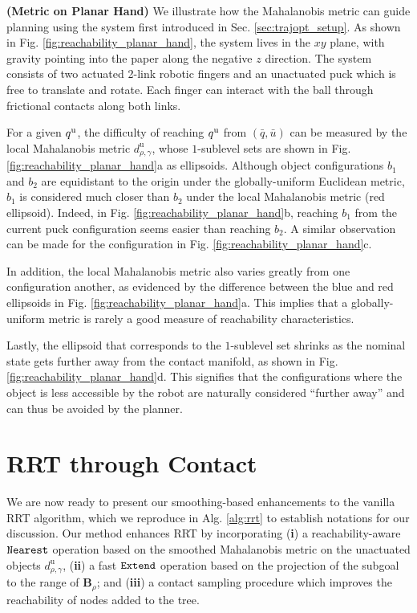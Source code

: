 \begin{example} \normalfont \textbf{(Metric on Planar Hand)}
\label{ex:planarhandreachableset}
We illustrate how the Mahalanobis metric can guide planning using the  system first introduced in Sec. \ref{sec:trajopt_setup}.
As shown in Fig. \ref{fig:reachability_planar_hand}, the system lives in the $xy$ plane, with gravity pointing into the paper along the negative $z$ direction. The system consists of two actuated 2-link robotic fingers and an unactuated puck which is free to translate and rotate. Each finger can interact with the ball through frictional contacts along both links.

For a given ${q^\mathrm{u}}$, the difficulty of reaching ${q^\mathrm{u}}$ from $(\bar{q}, \bar{u})$ can be measured by the local Mahalanobis metric $d^\mathrm{u}_{\rho, \gamma}$, whose $1$-sublevel sets are shown in Fig. \ref{fig:reachability_planar_hand}a as ellipsoids. Although object configurations $b_1$ and $b_2$ are equidistant to the origin under the globally-uniform Euclidean metric, $b_1$ is considered much closer than $b_2$ under the local Mahalanobis metric (red ellipsoid). Indeed, in Fig. \ref{fig:reachability_planar_hand}b, reaching $b_1$ from the current puck configuration seems easier than reaching $b_2$. A similar observation can be made for the configuration in Fig. \ref{fig:reachability_planar_hand}c.

In addition, the local Mahalanobis metric also varies greatly from one configuration another, as evidenced by the difference between the blue and red ellipsoids in Fig. \ref{fig:reachability_planar_hand}a. This implies that a globally-uniform metric is rarely a good measure of reachability characteristics.

Lastly, the ellipsoid that corresponds to the $1$-sublevel set shrinks as the nominal state gets further away from the contact manifold, as shown in Fig. \ref{fig:reachability_planar_hand}d. This signifies that the configurations where the object is less accessible by the robot are naturally considered ``further away'' and can thus be avoided by the planner.
\end{example}


\section{RRT through Contact \label{sec:rrt_for_contact}}
\noindent We are now ready to present our smoothing-based enhancements to the vanilla RRT algorithm, which we reproduce in Alg. \ref{alg:rrt} to establish notations for our discussion. Our method enhances RRT by incorporating
(\textbf{i}) a reachability-aware $\mathtt{Nearest}$ operation based on the smoothed Mahalanobis metric on the unactuated objects $d_{\rho,\gamma}^\mathrm{u}$,
(\textbf{ii}) a fast $\mathtt{Extend}$ operation based on the projection of the subgoal to the range of $\mathbf{B}_\rho$; and
(\textbf{iii}) a contact sampling procedure which improves the reachability of nodes added to the tree.

